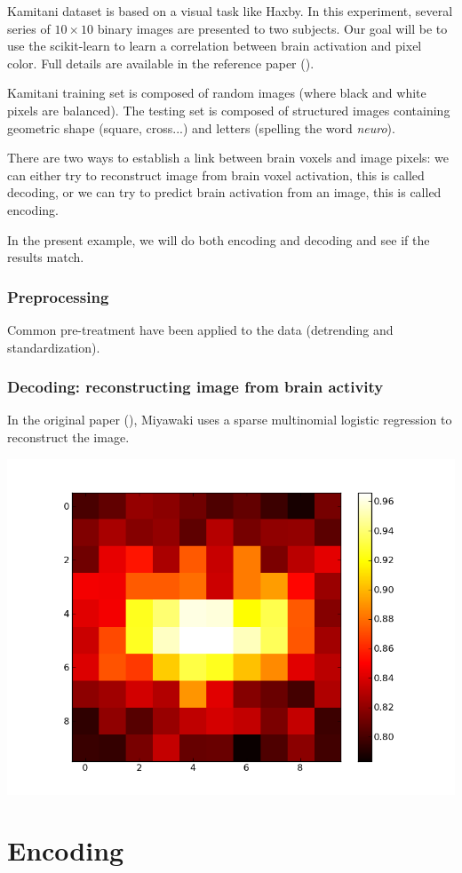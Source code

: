 \documentclass{frontiersSCNS} %
\begin{document}
Kamitani dataset is based on a visual task like Haxby. In this experiment,
several series of $10\times10$ binary images are presented to two subjects.
Our goal will be to use the scikit-learn to learn a correlation between brain
activation and pixel color. Full details are available in the reference paper
(\cite{miyawaki2008}).

Kamitani training set is composed of random images (where black and white pixels
are balanced). The testing set is composed of structured images containing
geometric shape (square, cross...) and letters (spelling the word \emph{neuro}).

There are two ways to establish a link between brain voxels and image pixels: we
can either try to reconstruct image from brain voxel activation, this is called
decoding, or we can try to predict brain activation from an image, this is called
encoding.

In the present example, we will do both encoding and decoding and see if the
results match.

\subsubsection{Preprocessing}

Common pre-treatment have been applied to the data (detrending and
standardization).

\subsubsection{Decoding: reconstructing image from brain activity}

In the original paper (\cite{miyawaki2008}), Miyawaki uses a sparse multinomial
logistic regression to reconstruct the image.




\includegraphics[width=.5\linewidth]{img/logistic_l1_scores.png}

\section{Encoding}
\end{document}
